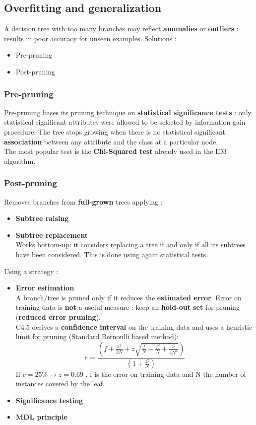 \subsection{Overfitting and generalization}
A decision tree with too many branches may reflect \textbf{anomalies} or \textbf{outliers} : results in poor accuracy for unseen examples.
Solutions :
\begin{itemize}
\item Pre-pruning
\item Post-pruning
\end{itemize}

\subsubsection{Pre-pruning}
Pre-pruning bases its pruning technique on \textbf{statistical significance tests} : only statistical significant attributes were allowed to be selected by information gain procedure. The tree stops growing when there is no statistical significant \textbf{association} between any attribute and the class at a particular node.\\
The most popular test is the \textbf{Chi-Squared test} already used in the ID3 algorithm.

\subsubsection{Post-pruning}
Removes branches from \textbf{full-grown} trees applying :
\begin{itemize}
\item \textbf{Subtree raising}
\item \textbf{Subtree replacement}\\
Works bottom-up: it considers replacing a tree if and only if all its subtrees have been considered. This is done using again statistical tests.
\end{itemize} 
Using a strategy : 
\begin{itemize}
\item \textbf{Error estimation}\\
A branch/tree is pruned only if it reduces the \textbf{estimated error}. Error on training data is \textbf{not} a useful measure : keep an \textbf{hold-out set} for pruning (\textbf{reduced error pruning}).\\
C4.5 derives a \textbf{confidence interval} on the training data and uses a heuristic limit for pruning (Standard Bernoulli based method):
$$ e = \frac{ \left(f+ \frac{z^2}{2N} + z \sqrt{\frac{f}{N}-\frac{f^2}{N}+ \frac{z^2}{4N^2}} \right)}{ \left( 1+ \frac{z^2}{N}\right) }$$
If $c=25\% \rightarrow z= 0.69$ , f is the error on training data and N the number of instances covered by the leaf.
\item \textbf{Significance testing}
\item \textbf{MDL principle}
\end{itemize}

